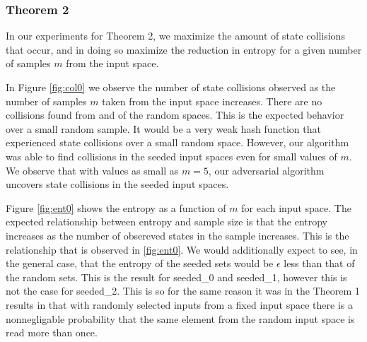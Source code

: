 \documentclass[letterpaper,twocolumn,10pt]{article}
\begin{document}
\subsubsection{Theorem 2}

In our experiments for Theorem 2, we maximize the amount of state collisions that occur, and in doing so maximize the reduction in entropy for a given number of samples $m$ from the input space. 

In Figure \ref{fig:col0} we observe the number of state collisions observed as the number of samples $m$ taken from the input space increases. There are no collisions found from and of the random spaces. This is the expected behavior over a small random sample. It would be a very weak hash function that experienced state collisions over a small random space. However, our algorithm was able to find collisions in the seeded input spaces even for small values of $m$. We observe that with values as small as $m = 5$, our adversarial algorithm uncovers state collisions in the seeded input spaces. 

Figure \ref{fig:ent0} shows the entropy as a function of $m$ for each input space. The expected relationship between entropy and sample size is that the entropy increases as the number of obsereved states in the sample increases. This is the relationship that is observed in \ref{fig:ent0}. We would additionally expect to see, in the general case, that the entropy of the seeded sets would be $\epsilon$ less than that of the random sets. This is the result for seeded\_0 and seeded\_1, however this is not the case for seeded\_2. This is so for the same reason it was in the Theorem 1 results in that with randomly selected inputs from a fixed input space there is a non\-negligable probability that the same element from the random input space is read more than once.  
\end{document}
